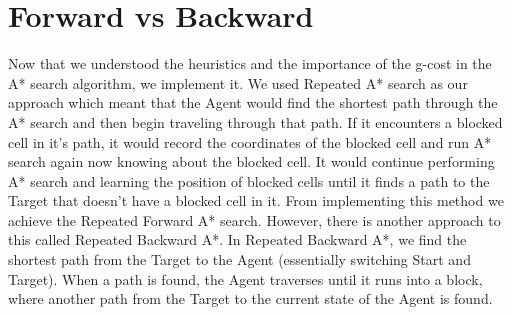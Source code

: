 \documentclass{article}
\begin{document}
\section{Forward vs Backward}
Now that we understood the heuristics and the importance of the g-cost in the A* search algorithm, we implement it. We used Repeated A* search as our approach which meant that the Agent would find the shortest path through the A* search and then begin traveling through that path. If it encounters a blocked cell in it's path, it would record the coordinates of the blocked cell and run A* search again now knowing about the blocked cell. It would continue performing A* search and learning the position of blocked cells until it finds a path to the Target that doesn't have a blocked cell in it. From implementing this method we achieve the Repeated Forward A* search. However, there is another approach to this called Repeated Backward A*. In Repeated Backward A*, we find the shortest path from the Target to the Agent (essentially switching Start and Target). When a path is found, the Agent traverses until it runs into a block, where another path from the Target to the current state of the Agent is found. 
\newline
\newline
\end{document}

